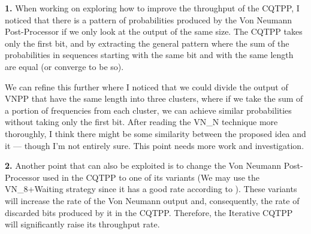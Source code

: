 \textbf{1.} When working on exploring how to improve the throughput of the CQTPP, I noticed that there is a pattern of probabilities produced by the Von Neumann Post-Processor if we only look at the output of the same size. The CQTPP takes only the first bit, and by extracting the general pattern where the sum of the probabilities in sequences starting with the same bit and with the same length are equal (or converge to be so).

We can refine this further where I noticed that we could divide the output of VNPP that have the same length into three clusters, where if we take the sum of a portion of frequencies from each cluster, we can achieve similar probabilities without taking only the first bit. After reading the VN\_N technique \cite{zonga} more thoroughly, I think there might be some similarity between the proposed idea and it — though I’m not entirely sure. This point needs more work and investigation.

\textbf{2.} Another point that can also be exploited is to change the Von Neumann Post-Processor used in the CQTPP to one of its variants (We may use the VN\_8+Waiting strategy since it has a good rate according to \cite{zonga}). These variants will increase the rate of the Von Neumann output and, consequently, the rate of discarded bits produced by it in the CQTPP. Therefore, the Iterative CQTPP will significantly raise its throughput rate.